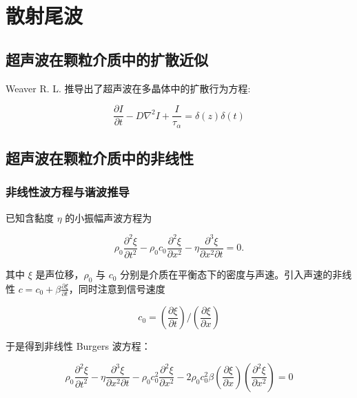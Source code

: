 
\chapter{散射尾波}

\section{超声波在颗粒介质中的扩散近似}

Weaver R. L. 推导出了超声波在多晶体中的扩散行为方程\cite{diffusivity}:

\begin{equation}
  \frac{\partial I}{\partial t} - D\nabla^{2}I + \frac{I}{\tau_{\alpha}} = \delta(z)\delta(t)
\end{equation}


\section{超声波在颗粒介质中的非线性}

\subsection{非线性波方程与谐波推导}

已知含黏度 $\eta$ 的小振幅声波方程为

\begin{equation}
  \rho_{0}\frac{\partial^{2}\xi}{\partial t^{2}} - \rho_{0}c_{0}\frac{\partial^{2}\xi}{\partial x^{2}} - \eta\frac{\partial^{3}\xi}{\partial x^{2}\partial t} = 0.
\end{equation}

其中 $\xi$ 是声位移，$\rho_{0}$ 与 $c_{0}$ 分别是介质在平衡态下的密度与声速。引入声速的非线性 $c = c_{0} + \beta\frac{\partial\xi}{\partial t}$，同时注意到信号速度

\begin{equation}
  c_{0} = \left(\frac{\partial \xi}{\partial t}\right)/\left(\frac{\partial\xi}{\partial x}\right)
\end{equation}

于是得到非线性 Burgers 波方程：


\begin{equation}
  \rho_{0}\frac{\partial^{2}\xi}{\partial t^{2}} - \eta\frac{\partial^{3}\xi}{\partial x^{2}\partial t} - \rho_{0}c_{0}^{2}\frac{\partial^{2}\xi}{\partial x^{2}} - 2\rho_{0}c_{0}^{2}\beta\left(\frac{\partial \xi}{\partial x}\right)\left(\frac{\partial^{2} \xi}{\partial x^{2}}\right) = 0
\end{equation}



